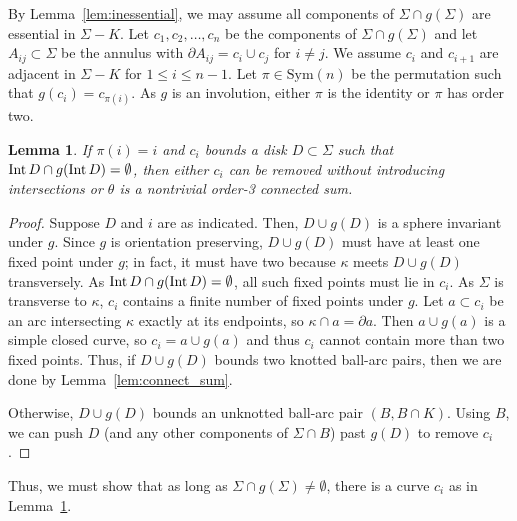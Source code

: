 \documentclass{amsart}
\numberwithin{equation}{section}
\newtheorem{lemma}[theorem]{Lemma}
\theoremstyle{definition}
\newcommand{\tn}[1]{\textnormal{#1}}
\newcommand{\Int}[1]{\tn{Int} \, #1}
\begin{document}

By Lemma~\ref{lem:inessential}, we may assume all components of $\Sigma\cap g(\Sigma)$ are essential in $\Sigma-K$.
Let $c_1,c_2,\dots,c_n$ be the components of $\Sigma\cap g(\Sigma)$ and let $A_{ij}\subset\Sigma$ be the annulus with $\partial A_{ij}=c_i\cup c_j$ for $i\neq j$.
We assume $c_i$ and $c_{i+1}$ are adjacent in $\Sigma-K$ for $1\leq i\leq n-1$.
Let $\pi\in\mathrm{Sym}(n)$ be the permutation such that $g(c_i)=c_{\pi(i)}$.
As $g$ is an involution, either $\pi$ is the identity or $\pi$ has order two.

\begin{lemma}\label{lem:fixed_scc}
If $\pi(i)=i$ and $c_i$ bounds a disk $D\subset\Sigma$ such that $\Int D\cap g(\Int D)=\emptyset$, then either $c_i$ can be removed without introducing intersections or $\theta$ is a nontrivial order-3 connected sum.
\end{lemma}
\begin{proof}
Suppose $D$ and $i$ are as indicated. Then, $D\cup g(D)$ is a sphere invariant under $g$.
Since $g$ is orientation preserving, $D\cup g(D)$ must have at least one fixed point under $g$; in fact, it must have two because $\kappa$ meets $D\cup g(D)$ transversely.
As $\Int D\cap g(\Int D)=\emptyset$, all such fixed points must lie in $c_i$.
As $\Sigma$ is transverse to $\kappa$, $c_i$ contains a finite number of fixed points under $g$.
Let $a\subset c_i$ be an arc intersecting $\kappa$ exactly at its endpoints, so $\kappa\cap a=\partial a$.
Then $a\cup g(a)$ is a simple closed curve, so $c_i=a\cup g(a)$ and thus $c_i$ cannot contain more than two fixed points.
Thus, if $D\cup g(D)$ bounds two knotted ball-arc pairs, then we are done by Lemma~\ref{lem:connect_sum}.

Otherwise, $D\cup g(D)$ bounds an unknotted ball-arc pair $(B,B\cap K)$.
Using $B$, we can push $D$ (and any other components of $\Sigma\cap B$) past $g(D)$ to remove $c_i$.
\end{proof}

Thus, we must show that as long as $\Sigma\cap g(\Sigma)\neq\emptyset$, there is a curve $c_i$ as in Lemma~\ref{lem:fixed_scc}.
\end{document}
